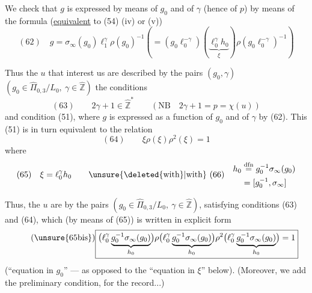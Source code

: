 We check  that $g$ is expressed by means of $g_0$ and of $\gamma$ (hence of $p$) by means of the formula (\uline{equivalent} to (54) (iv) or (v))
\[
(62)\quad
\boxed{g=\sigma_\infty(g_0)\ell_1^\gamma\rho(g_0)^{-1}}
\left(=(g_0\ell_0^{-\gamma})\left(\underbrace{\ell_0^\gamma h_0}_{\xi}\right)\rho(g_0\ell_0^{-\gamma})^{-1}\right)
\]


Thus the $u$ that interest us are described by the pairs $(g_0,\gamma)$ $(g_0\in\widehat{\Pi}_{0,3}/L_0,\ \gamma\in\widehat{\mathbb Z})$  the conditions
\[
(63)\qquad 2\gamma+1\in\widehat{\mathbb Z}^{\ast}\qquad (\mathrm{NB}\quad 2\gamma+1=p=\chi(u))
\]
and condition (51), where $g$ is expressed as a function of $g_0$ and of $\gamma$ by (62). This  (51) is in turn equivalent to the relation
\[
(64)\qquad\boxed{\xi\rho(\xi)\rho^2(\xi)=1}
\]
where
\[
(65)\quad\xi=\ell_0^\gamma h_0
\qquad\unsure{\deleted{\text{with}}|\text{with}}\ (66)\quad
\begin{aligned}
h_0&\overset{\mathrm{dfn}}{=}
g_0^{-1}\sigma_\infty(g_0)\\
&{}=[g_0^{-1},\sigma_\infty]
\end{aligned}
\]



Thus, the $u$ are  by the pairs
$(g_0\in\widehat{\Pi}_{0,3}/L_0,\ \gamma\in\widehat{\mathbb Z})$, satisfying conditions
(63) and (64), which (by means of (65)) is written in explicit form
\[
\tag{\unsure{65bis}}
\boxed{
\bigl(\ell_0^\gamma\underbrace{g_0^{-1}\sigma_\infty(g_0)}_{h_0}\bigr)
\rho\bigl(\ell_0^\gamma\underbrace{g_0^{-1}\sigma_\infty(g_0)}_{h_0}\bigr)
\rho^2\bigl(\ell_0^\gamma\underbrace{g_0^{-1}\sigma_\infty(g_0)}_{h_0}\bigr)=1
}
\]
(``equation in $g_0$'' --- as opposed to the ``equation in $\xi$'' below).
(Moreover, we  add the preliminary condition, for the record...)

